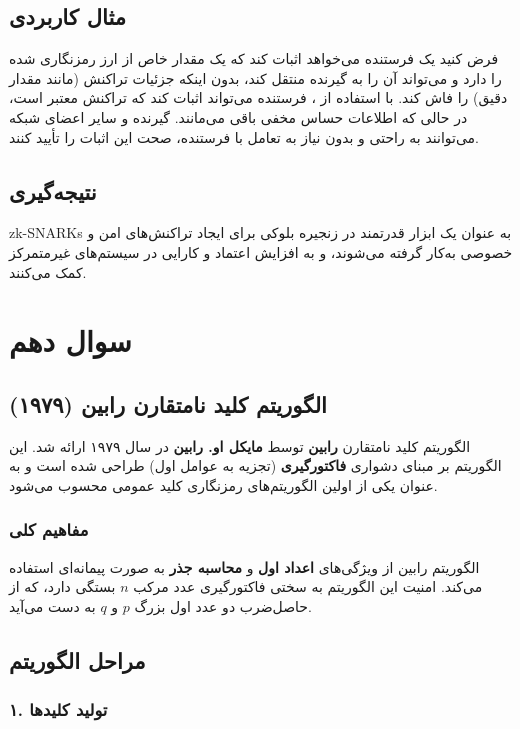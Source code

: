 \documentclass{report}
\begin{document}
\subsection*{مثال کاربردی}
فرض کنید یک فرستنده می‌خواهد اثبات کند که یک مقدار خاص از ارز رمزنگاری شده را دارد و می‌تواند آن را به گیرنده منتقل کند، بدون اینکه جزئیات تراکنش (مانند مقدار دقیق) را فاش کند. با استفاده از ، فرستنده می‌تواند اثبات کند که تراکنش معتبر است، در حالی که اطلاعات حساس مخفی باقی می‌مانند. گیرنده و سایر اعضای شبکه می‌توانند به راحتی و بدون نیاز به تعامل با فرستنده، صحت این اثبات را تأیید کنند.

\subsection*{نتیجه‌گیری}
zk-SNARKs به عنوان یک ابزار قدرتمند در زنجیره بلوکی برای ایجاد تراکنش‌های امن و خصوصی به‌کار گرفته می‌شوند، و به افزایش اعتماد و کارایی در سیستم‌های غیرمتمرکز کمک می‌کنند.

\section{سوال دهم}

\subsection*{الگوریتم کلید نامتقارن رابین (۱۹۷۹)}
    الگوریتم کلید نامتقارن \textbf{رابین} توسط \textbf{مایکل او. رابین} در سال ۱۹۷۹ ارائه شد. این الگوریتم بر مبنای دشواری \textbf{فاکتورگیری} (تجزیه به عوامل اول) طراحی شده است و به عنوان یکی از اولین الگوریتم‌های رمزنگاری کلید عمومی محسوب می‌شود.
    
\subsubsection*{مفاهیم کلی}
    الگوریتم رابین از ویژگی‌های \textbf{اعداد اول} و \textbf{محاسبه جذر} به صورت پیمانه‌ای استفاده می‌کند. امنیت این الگوریتم به سختی فاکتورگیری عدد مرکب \( n \) بستگی دارد، که از حاصل‌ضرب دو عدد اول بزرگ \( p \) و \( q \) به دست می‌آید.
    
\subsection*{مراحل الگوریتم}

\subsubsection*{۱. تولید کلیدها}
\end{document}
